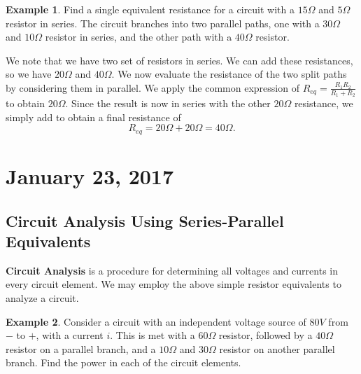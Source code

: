 \documentclass[11pt]{article}
\theoremstyle{plain} %
\theoremstyle{definition}
\theoremstyle{example}
\newtheorem*{example}{Example}
\theoremstyle{remark}
\begin{document}
\begin{example}
Find a single equivalent resistance for a circuit with a $15\Omega $ and $5\Omega$ resistor in series. The circuit branches into two parallel paths, one with a $30\Omega$ and $10\Omega$ resistor in series, and the other path with a $40\Omega$ resistor. 
\end{example}

We note that we have two set of resistors in series. We can add these resistances, so we have $20\Omega$ and $40\Omega$. We now evaluate the resistance of the two split paths by considering them in parallel. We apply the common expression of $R_{eq}= \frac{R_1R_2}{R_1+R_2}$ to obtain $20\Omega$. Since the result is now in series with the other $20\Omega$ resistance, we simply add to obtain a final resistance of 
$$R_{eq} = 20\Omega + 20\Omega = 40\Omega.$$

\section{January 23, 2017}
\subsection{Circuit Analysis Using Series-Parallel Equivalents}

\textbf{Circuit Analysis} is a procedure for determining all voltages and currents in every circuit element. We may employ the above simple resistor equivalents to analyze a circuit. 

\begin{example}
Consider a circuit with an independent voltage source of $80V$ from $-$ to $+$, with a current $i$. This is met with a $60\Omega$ resistor, followed by a $40\Omega$ resistor on a parallel branch, and a $10\Omega$ and $30\Omega$ resistor on another parallel branch. Find the power in each of the circuit elements. 
\end{example}
\end{document}
